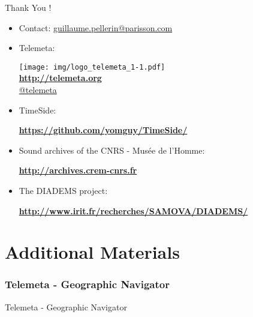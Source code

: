 \documentclass[final, hyperref, table]{beamer}
\begin{document}
\begin{frame}{Thank You !}
  \begin{itemize}
  \item Contact: \url{guillaume.pellerin@parisson.com}
  \item Telemeta:
    \begin{center}
    \texttt{[image: img/logo\_telemeta\_1-1.pdf]}\\
      \colorbox{yellow!40}{\textbf{\url{http://telemeta.org}}}\\
      \colorbox{yellow!40}{\href{https://twitter.com/telemeta/}{@telemeta}}
    \end{center}

  \item TimeSide:
    \begin{center}
      \colorbox{yellow!40}{\bf
        \url{https://github.com/yomguy/TimeSide/}}
    \end{center}

  \item Sound archives of the CNRS - Musée de l’Homme:
    \begin{center}
      \colorbox{yellow!40}{\bf\url{http://archives.crem-cnrs.fr}}
    \end{center}

  \item The DIADEMS project:
    \begin{center}
      \colorbox{yellow!40}{\bf\url{http://www.irit.fr/recherches/SAMOVA/DIADEMS/}}
    \end{center}

  \end{itemize}
\end{frame}

\appendix
\section{Additional Materials}

\subsubsection{Telemeta - Geographic Navigator}
\begin{frame}[plain, label=geonavigator]{Telemeta - Geographic Navigator}
  \begin{center}
  \end{center}
\hyperlink{telemeta_features}{}
\end{frame}
\end{document}
